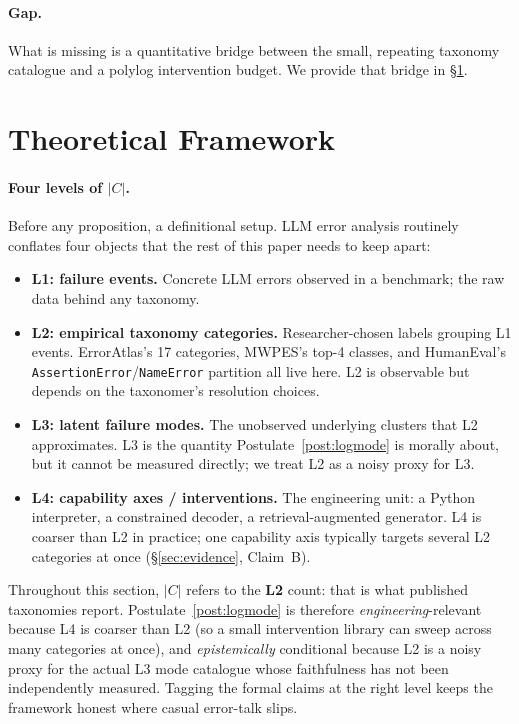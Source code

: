 \documentclass{article}
\theoremstyle{taeplain}
\theoremstyle{taedefn}
\begin{document}
\paragraph{Gap.}
What is missing is a quantitative bridge between the small, repeating taxonomy catalogue and a polylog intervention budget. We provide that bridge in \S\ref{sec:framework}.

\section{Theoretical Framework}
\label{sec:framework}

\paragraph{Four levels of $|C|$.}
Before any proposition, a definitional setup. LLM error analysis routinely conflates four objects that the rest of this paper needs to keep apart:

\begin{itemize}[leftmargin=1.8em,itemsep=0.3ex]
\item \textbf{L1: failure events.} Concrete LLM errors observed in a benchmark; the raw data behind any taxonomy.
\item \textbf{L2: empirical taxonomy categories.} Researcher-chosen labels grouping L1 events. ErrorAtlas's 17 categories, MWPES's top-4 classes, and HumanEval's \texttt{AssertionError}/\texttt{NameError} partition all live here. L2 is observable but depends on the taxonomer's resolution choices.
\item \textbf{L3: latent failure modes.} The unobserved underlying clusters that L2 approximates. L3 is the quantity Postulate~\ref{post:logmode} is morally about, but it cannot be measured directly; we treat L2 as a noisy proxy for L3.
\item \textbf{L4: capability axes / interventions.} The engineering unit: a Python interpreter, a constrained decoder, a retrieval-augmented generator. L4 is coarser than L2 in practice; one capability axis typically targets several L2 categories at once (\S\ref{sec:evidence}, Claim~B).
\end{itemize}

Throughout this section, $|C|$ refers to the \textbf{L2} count: that is what published taxonomies report. Postulate~\ref{post:logmode} is therefore \emph{engineering}-relevant because L4 is coarser than L2 (so a small intervention library can sweep across many categories at once), and \emph{epistemically} conditional because L2 is a noisy proxy for the actual L3 mode catalogue whose faithfulness has not been independently measured. Tagging the formal claims at the right level keeps the framework honest where casual error-talk slips.
\end{document}
